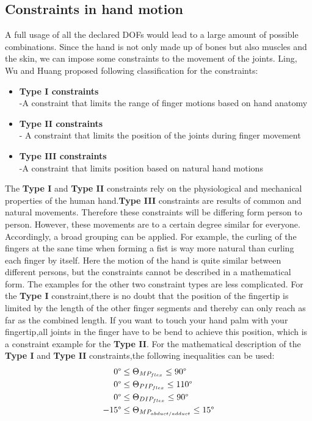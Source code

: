 \subsection{Constraints in hand motion}
A full usage of all the declared DOFs would lead to a large amount of possible combinations. Since the hand is not only made up of bones but also muscles and the skin, we can impose some constraints \cite{Badler.1987,Pavlovic.1997} to the movement of the joints. Ling, Wu and Huang\cite{LIN.2000} proposed following classification for the constraints:
\begin{itemize}
\item \textbf{Type I constraints}\\
	-A constraint that limits the range of finger motions based on hand anatomy
	\item \textbf{Type II constraints}\\
	- A constraint that limits the position of the joints during finger movement
	\item \textbf{Type III constraints\\}
	-A constraint that limits position based on natural hand motions
\end{itemize} 
The \textbf{Type I} and \textbf{Type II} constraints rely on the physiological and mechanical properties of the human hand.\textbf{Type III} constraints are results of common and natural movements. Therefore these constraints will be differing form person to person. However, these movements are to a certain degree similar for everyone. Accordingly, a broad grouping can be applied. For example, the curling of the fingers at the sane time when forming a fist is way more natural than curling each finger by itself. Here the motion of the hand is quite similar between different persons, but the constraints cannot be described in a mathematical form. The examples for the other two constraint types are less complicated. For the \textbf{Type I} constraint,there is no doubt that the position of the fingertip is limited by the length of the other finger segments and thereby can only reach as far as the combined length. If you want to touch your hand palm with your fingertip,all joints in the finger have to be bend to achieve this position, which is a constraint example for the \textbf{Type II}. For the mathematical description of the \textbf{Type I} and \textbf{Type II} constraints,the following inequalities can be used:\\
\begin{equation}
\begin{split}
0\degree&\leq \Theta _{MP_{flex}} \leq 90\degree\\
0\degree&\leq \Theta _{PIP_{flex}} \leq 110\degree\\
0\degree&\leq \Theta _{DIP_{flex}} \leq 90\degree\\
-15\degree&\leq \Theta _{MP_{abduct/adduct}} \leq 15\degree
\end{split}
\end{equation}
